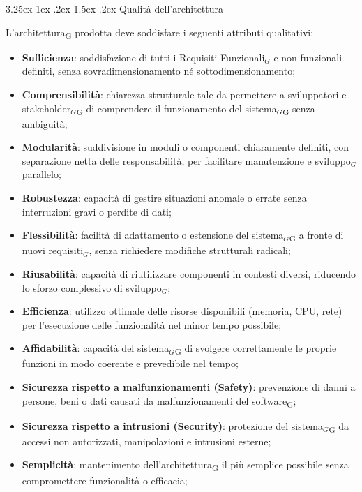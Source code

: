 \documentclass[a4paper, 10pt]{article}
\makeatletter
\renewcommand\paragraph{\@startsection{paragraph}{4}{\z@}%
  {3.25ex \@plus1ex \@minus .2ex}%
  {1.5ex \@plus .2ex}%
  {\normalfont\normalsize\bfseries}}
\makeatother
\begin{document}
\paragraph{Qualità dell'architettura}

L'architettura\textsubscript{G} prodotta deve soddisfare i seguenti attributi qualitativi:

\begin{itemize}
    \item \textbf{Sufficienza}: soddisfazione di tutti i Requisiti Funzionali$_G$ e non funzionali definiti, senza sovradimensionamento né sottodimensionamento;
    \item \textbf{Comprensibilità}: chiarezza strutturale tale da permettere a sviluppatori e stakeholder$_G$\textsubscript{G} di comprendere il funzionamento del sistema$_G$\textsubscript{G} senza ambiguità;
    \item \textbf{Modularità}: suddivisione in moduli o componenti chiaramente definiti, con separazione netta delle responsabilità, per facilitare manutenzione e sviluppo$_G$ parallelo;
    \item \textbf{Robustezza}: capacità di gestire situazioni anomale o errate senza interruzioni gravi o perdite di dati;
    \item \textbf{Flessibilità}: facilità di adattamento o estensione del sistema$_G$\textsubscript{G} a fronte di nuovi requisiti$_G$, senza richiedere modifiche strutturali radicali;
    \item \textbf{Riusabilità}: capacità di riutilizzare componenti in contesti diversi, riducendo lo sforzo complessivo di sviluppo$_G$;
    \item \textbf{Efficienza}: utilizzo ottimale delle risorse disponibili (memoria, CPU, rete) per l'esecuzione delle funzionalità nel minor tempo possibile;
    \item \textbf{Affidabilità}: capacità del sistema$_G$\textsubscript{G} di svolgere correttamente le proprie funzioni in modo coerente e prevedibile nel tempo;
    \item \textbf{Sicurezza rispetto a malfunzionamenti (Safety)}: prevenzione di danni a persone, beni o dati causati da malfunzionamenti del software\textsubscript{G};
    \item \textbf{Sicurezza rispetto a intrusioni (Security)}: protezione del sistema$_G$\textsubscript{G} da accessi non autorizzati, manipolazioni e intrusioni esterne;
    \item \textbf{Semplicità}: mantenimento dell'architettura\textsubscript{G} il più semplice possibile senza compromettere funzionalità o efficacia;

\end{itemize}
\end{document}
